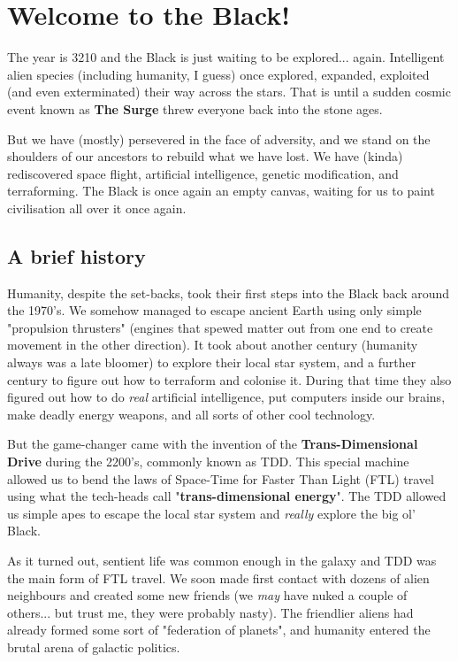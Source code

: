 \section{Welcome to the Black!}

\begin{multicols}{2}
  The year is 3210 and the Black is just waiting to be explored... again. Intelligent alien species (including humanity, I guess) once explored, expanded, exploited (and even exterminated) their way across the stars. That is until a sudden cosmic event known as \textbf{The Surge} threw everyone back into the stone ages.

  But we have (mostly) persevered in the face of adversity, and we stand on the shoulders of our ancestors to rebuild what we have lost. We have (kinda) rediscovered space flight, artificial intelligence, genetic modification, and terraforming. The Black is once again an empty canvas, waiting for us to paint civilisation all over it once again.
  
  \subsection{A brief history}

  Humanity, despite the set-backs, took their first steps into the Black back around the 1970's. We somehow managed to escape ancient Earth using only simple "propulsion thrusters" (engines that spewed matter out from one end to create movement in the other direction). It took about another century (humanity always was a late bloomer) to explore their local star system, and a further century to figure out how to terraform and colonise it. During that time they also figured out how to do \textit{real} artificial intelligence, put computers inside our brains, make deadly energy weapons, and all sorts of other cool technology.

  But the game-changer came with the invention of the \textbf{Trans-Dimensional Drive} during the 2200's, commonly known as TDD. This special machine allowed us to bend the laws of Space-Time for Faster Than Light (FTL) travel using what the tech-heads call "\textbf{trans-dimensional energy}". The TDD allowed us simple apes to escape the local star system and \textit{really} explore the big ol' Black.

  As it turned out, sentient life was common enough in the galaxy and TDD was the main form of FTL travel. We soon made first contact with dozens of alien neighbours and created some new friends (we \textit{may} have nuked a couple of others... but trust me, they were probably nasty). The friendlier aliens had already formed some sort of "federation of planets", and humanity entered the brutal arena of galactic politics.
  

\end{multicols}
